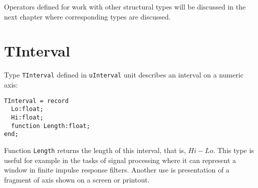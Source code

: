\documentclass[12pt,a4paper,oneside]{article}
\newcommand{\code}[1]{\texttt{#1}}
\begin{document}
Operators defined for work with other structural types will be discussed in the next chapter where corresponding types are discussed.

\section{TInterval}
Type \code{TInterval} defined in \code{uInterval} unit describes an interval on a numeric axis:
\begin{verbatim}
TInterval = record
  Lo:float;
  Hi:float;
  function Length:float;
end;
\end{verbatim}
Function \code{Length} returns the length of this interval, that is, $Hi-Lo$.
This type is useful for example in the tasks of signal processing where it can represent a window in finite impulse response filters. Another use is presentation of a fragment of axis shown on a screen or printout.
\end{document}
